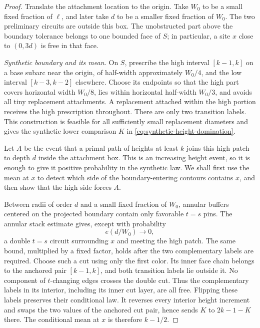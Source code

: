 \begin{proof}
Translate the attachment location to the origin.  Take $W_0$ to be a small
fixed fraction of $\ell$, and later take $d$ to be a smaller fixed fraction
of $W_0$.  The two preliminary circuits are outside this box.  The
unobstructed part above the boundary tolerance belongs to one bounded face
of $S$; in particular, a site $x$ close to $(0,3d)$ is free in that face.

\emph{Synthetic boundary and its mean.}
On $S$, prescribe the high interval $[k-1,k]$ on a base subarc near the
origin, of half-width approximately $W_0/4$, and the low interval
$[k-3,k-2]$ elsewhere.  Choose its endpoints so that the high part covers
horizontal width $W_0/8$, lies within horizontal half-width $W_0/3$, and
avoids all tiny replacement attachments.  A replacement attached within
the high portion receives the high prescription throughout.  There are
only two transition labels.  This construction is feasible for all
sufficiently small replacement diameters and gives the synthetic lower
comparison $K$ in \eqref{eq:synthetic-height-domination}.

Let $A$ be the event that a primal path of heights at least $k$ joins this
high patch to depth $d$ inside the attachment box.  This is an increasing
height event, so it is enough to give it positive probability in the
synthetic law.  We shall first use the mean at $x$ to detect which side of
the boundary-entering contours contains $x$, and then show that the high
side forces $A$.

Between radii of order $d$ and a small fixed fraction of $W_0$, annular
buffers centered on the projected boundary contain only favorable $t=s$
pins.  The annular stack estimate gives, except with probability
\begin{equation}\label{eq:attachment-cut-error}
                      e(d/W_0)\longrightarrow0,
\end{equation}
a double $t=s$ circuit surrounding $x$ and meeting the high patch.  The
same bound, multiplied by a fixed factor, holds after the two complementary
labels are required.  Choose such a cut using only the first color.  Its
inner face chain belongs to the anchored pair $[k-1,k]$, and both transition
labels lie outside it.  No component of $t$-changing edges crosses the
double cut.  Thus the complementary labels in its interior, including its
inner cut layer, are all free.  Flipping these labels preserves their
conditional law.  It reverses every interior height increment and swaps
the two values of the anchored cut pair, hence sends
$K$ to $2k-1-K$ there.  The conditional mean at $x$ is therefore $k-1/2$.


\end{proof}
